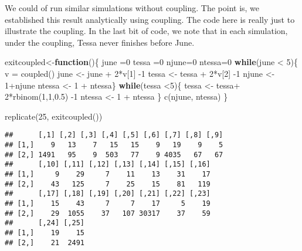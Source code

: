 \documentclass[
]{article}
\newenvironment{Shaded}{\begin{snugshade}}{\end{snugshade}}
\newcommand{\ControlFlowTok}[1]{\textcolor[rgb]{0.13,0.29,0.53}{\textbf{#1}}}
\newcommand{\DecValTok}[1]{\textcolor[rgb]{0.00,0.00,0.81}{#1}}
\newcommand{\FloatTok}[1]{\textcolor[rgb]{0.00,0.00,0.81}{#1}}
\newcommand{\FunctionTok}[1]{\textcolor[rgb]{0.00,0.00,0.00}{#1}}
\newcommand{\NormalTok}[1]{#1}
\newcommand{\OtherTok}[1]{\textcolor[rgb]{0.56,0.35,0.01}{#1}}
\newcommand{\SpecialCharTok}[1]{\textcolor[rgb]{0.00,0.00,0.00}{#1}}
\theoremstyle{definition}
\theoremstyle{definition}
\theoremstyle{definition}
\theoremstyle{remark}
\begin{document}
We could of run similar simulations without coupling. The point is, we established this result analytically using coupling. The code here is really just to illustrate the coupling. In the last bit of code, we note that in each simulation, under the coupling, Tessa never finishes before June.

\begin{Shaded}
\begin{Highlighting}[]
\NormalTok{exitcoupled}\OtherTok{\textless{}{-}}\ControlFlowTok{function}\NormalTok{()\{}
\NormalTok{  june }\OtherTok{=}\DecValTok{0}
\NormalTok{  tessa }\OtherTok{=}\DecValTok{0}
\NormalTok{  njune}\OtherTok{=}\DecValTok{0}
\NormalTok{  ntessa}\OtherTok{=}\DecValTok{0}
  \ControlFlowTok{while}\NormalTok{(june }\SpecialCharTok{\textless{}} \DecValTok{5}\NormalTok{)\{}
\NormalTok{    v }\OtherTok{=} \FunctionTok{coupled}\NormalTok{()}
\NormalTok{    june }\OtherTok{\textless{}{-}}\NormalTok{ june }\SpecialCharTok{+} \DecValTok{2}\SpecialCharTok{*}\NormalTok{v[}\DecValTok{1}\NormalTok{] }\SpecialCharTok{{-}}\DecValTok{1}
\NormalTok{    tessa }\OtherTok{\textless{}{-}}\NormalTok{ tessa }\SpecialCharTok{+} \DecValTok{2}\SpecialCharTok{*}\NormalTok{v[}\DecValTok{2}\NormalTok{] }\SpecialCharTok{{-}}\DecValTok{1}
\NormalTok{    njune }\OtherTok{\textless{}{-}} \DecValTok{1}\SpecialCharTok{+}\NormalTok{njune}
\NormalTok{    ntessa }\OtherTok{\textless{}{-}} \DecValTok{1} \SpecialCharTok{+}\NormalTok{ ntessa\}}
  \ControlFlowTok{while}\NormalTok{(tessa }\SpecialCharTok{\textless{}}\DecValTok{5}\NormalTok{)\{}
\NormalTok{    tessa }\OtherTok{\textless{}{-}}\NormalTok{ tessa}\SpecialCharTok{+} \DecValTok{2}\SpecialCharTok{*}\FunctionTok{rbinom}\NormalTok{(}\DecValTok{1}\NormalTok{,}\DecValTok{1}\NormalTok{,}\FloatTok{0.5}\NormalTok{) }\SpecialCharTok{{-}}\DecValTok{1}
\NormalTok{ntessa }\OtherTok{\textless{}{-}} \DecValTok{1} \SpecialCharTok{+}\NormalTok{ ntessa}
\NormalTok{  \}}
\FunctionTok{c}\NormalTok{(njune, ntessa)  }
\NormalTok{\}}
\end{Highlighting}
\end{Shaded}

\begin{Shaded}
\begin{Highlighting}[]
\FunctionTok{replicate}\NormalTok{(}\DecValTok{25}\NormalTok{, }\FunctionTok{exitcoupled}\NormalTok{())}
\end{Highlighting}
\end{Shaded}

\begin{verbatim}
##      [,1] [,2] [,3] [,4] [,5] [,6] [,7] [,8] [,9]
## [1,]    9   13    7   15   15    9   19    9    5
## [2,] 1491   95    9  503   77    9 4035   67   67
##      [,10] [,11] [,12] [,13] [,14] [,15] [,16]
## [1,]     9    29     7    11    13    31    17
## [2,]    43   125     7    25    15    81   119
##      [,17] [,18] [,19] [,20] [,21] [,22] [,23]
## [1,]    15    43     7     7    17     5    19
## [2,]    29  1055    37   107 30317    37    59
##      [,24] [,25]
## [1,]    19    15
## [2,]    21  2491
\end{verbatim}
\end{document}
